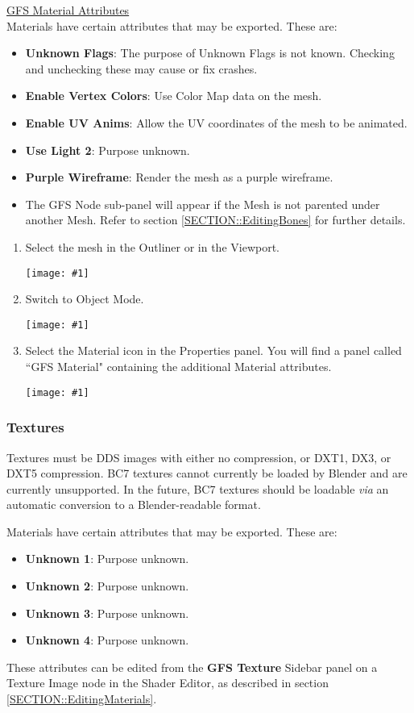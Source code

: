 \documentclass{article}
\newenvironment{guide}[1]
{
	\begin{center}
		\begin{tcolorbox}[%
			colback=black!20, 
			boxrule=0pt, 
			title=Step-by-step: #1,
			enhanced,
			breakable,
			overlay unbroken={%
                \draw[line width=1pt, black, rounded corners]
        	    (frame.north west) rectangle (frame.south east);
			},
    		overlay first={%
        		 \draw[line width=1pt, black, rounded corners]
        	    (frame.south west) -- (frame.north west) -- (frame.north east) -- (frame.south east);
                \draw[line width=1pt, black]
                (frame.south west) -- (frame.south east);
            },
    		overlay middle={%
                \draw[line width=1pt, black]
        	    (frame.north west) rectangle (frame.south east);
        	},
    		overlay last={%
                \draw[line width=1pt, black, rounded corners]
        	    (frame.north west) -- (frame.south west) -- (frame.south east) -- (frame.north east);
                \draw[line width=1pt, black]
                (frame.north west) -- (frame.north east);
           	}
        ]{}
    	\begin{enumerate}
}
{
    		\end{enumerate}
    	\end{tcolorbox}
	\end{center}  	 
}
\newcommand{\guideimage}[1]
{
	\begin{center}
		\texttt{[image: \#1]}
	\end{center}
}
\begin{document}
\noindent\underline{GFS Material Attributes}\\
\noindent Materials have certain attributes that may be exported. These are:
\begin{itemize}
\item \textbf{Unknown Flags}: The purpose of Unknown Flags is not known. Checking and unchecking these may cause or fix crashes.
\item \textbf{Enable Vertex Colors}: Use Color Map data on the mesh.
\item \textbf{Enable UV Anims}: Allow the UV coordinates of the mesh to be animated.
\item \textbf{Use Light 2}: Purpose unknown.
\item \textbf{Purple Wireframe}: Render the mesh as a purple wireframe.
\item The GFS Node sub-panel will appear if the Mesh is not parented under another Mesh. Refer to section \ref{SECTION::EditingBones} for further details.
\end{itemize}
\begin{guide}{Accessing Extra Material Attributes}
\item Select the mesh in the Outliner or in the Viewport.
\guideimage{images/editing_models/edits_select_mesh.png}
\item Switch to Object Mode.
\guideimage{images/editing_models/edits_to_object_mode.png}
\item Select the Material icon in the Properties panel. You will find a panel called ``GFS Material" containing the additional Material attributes.
\guideimage{images/editing_models/edits_material_properties.png}
\end{guide}

\subsubsection{Textures}
Textures must be DDS images with either no compression, or DXT1, DX3, or DXT5 compression. BC7 textures cannot currently be loaded by Blender and are currently unsupported. In the future, BC7 textures should be loadable \textit{via} an automatic conversion to a Blender-readable format.

\noindent Materials have certain attributes that may be exported. These are:
\begin{itemize}
\item \textbf{Unknown 1}: Purpose unknown.
\item \textbf{Unknown 2}: Purpose unknown.
\item \textbf{Unknown 3}: Purpose unknown.
\item \textbf{Unknown 4}: Purpose unknown.
\end{itemize}
These attributes can be edited from the \textbf{GFS Texture} Sidebar panel on a Texture Image node in the Shader Editor, as described in section \ref{SECTION::EditingMaterials}.
\end{document}
